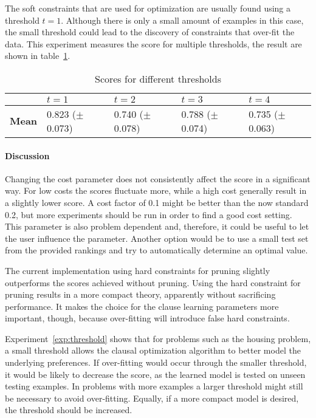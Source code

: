 \begin{experiment}
	\label{exp:threshold}
	The soft constraints that are used for optimization are usually found using a threshold $t = 1$.
	Although there is only a small amount of examples in this case, the small threshold could lead to the discovery of constraints that over-fit the data.
	This experiment measures the score for multiple thresholds, the result are shown in table~\ref{tbl:thresholds}.

	\begin{table}[!htp]
		\begin{tabularx}{\textwidth}{l|XXXX}
			& $t = 1$ & $t = 2$ & $t = 3$ & $t = 4$ \\
			\toprule
			\textbf{Mean} & 0.823 ($\pm$ 0.073) & 0.740 ($\pm$ 0.078) & 0.788 ($\pm$ 0.074) & 0.735 ($\pm$ 0.063)
		\end{tabularx}
		\caption{Scores for different thresholds}
		\label{tbl:thresholds}
	\end{table}
\end{experiment}

\paragraph{Discussion}
Changing the cost parameter does not consistently affect the score in a significant way.
For low costs the scores fluctuate more, while a high cost generally result in a slightly lower score.
A cost factor of 0.1 might be better than the now standard 0.2, but more experiments should be run in order to find a good cost setting.
This parameter is also problem dependent and, therefore, it could be useful to let the user influence the parameter.
Another option would be to use a small test set from the provided rankings and try to automatically determine an optimal value.

The current implementation using hard constraints for pruning slightly outperforms the scores achieved without pruning.
Using the hard constraint for pruning results in a more compact theory, apparently without sacrificing performance.
It makes the choice for the clause learning parameters more important, though, because over-fitting will introduce false hard constraints.

Experiment~\ref{exp:threshold} shows that for problems such as the housing problem, a small threshold allows the clausal optimization algorithm to better model the underlying preferences.
If over-fitting would occur through the smaller threshold, it would be likely to decrease the score, as the learned model is tested on unseen testing examples.
In problems with more examples a larger threshold might still be necessary to avoid over-fitting.
Equally, if a more compact model is desired, the threshold should be increased.